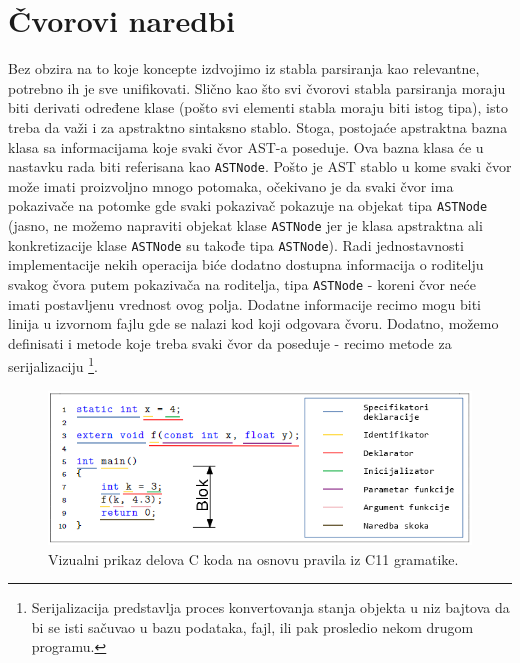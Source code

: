 \section{Čvorovi naredbi}
\label{sec:MyASTStatementNodes}


\iffalse
Bez obzira na to koje koncepte izdvojimo iz stabla parsiranja kao relevantne, potrebno ih je sve unifikovati. Slično kao što svi čvorovi stabla parsiranja moraju biti derivati određene klase (pošto svi elementi stabla moraju biti istog tipa), isto treba da važi i za apstraktno sintaksno stablo. Stoga, postojaće apstraktna bazna klasa sa informacijama koje svaki čvor AST-a poseduje. Ova bazna klasa će u nastavku rada biti referisana kao \texttt{ASTNode}. Pošto je AST stablo u kome svaki čvor može imati proizvoljno mnogo potomaka, očekivano je da svaki čvor ima pokazivače na potomke gde svaki pokazivač pokazuje na objekat tipa \texttt{ASTNode} (jasno, ne možemo napraviti objekat klase \texttt{ASTNode} jer je klasa apstraktna ali konkretizacije klase \texttt{ASTNode} su takođe tipa \texttt{ASTNode}). Radi jednostavnosti implementacije nekih operacija biće dodatno dostupna informacija o roditelju svakog čvora putem pokazivača na roditelja, tipa \texttt{ASTNode} - koreni čvor neće imati postavljenu vrednost ovog polja. Dodatne informacije recimo mogu biti linija u izvornom fajlu gde se nalazi kod koji odgovara čvoru. Dodatno, možemo definisati i metode koje treba svaki čvor da poseduje - recimo metode za serijalizaciju \footnote{Serijalizacija predstavlja proces konvertovanja stanja objekta u niz bajtova da bi se isti sačuvao u bazu podataka, fajl, ili pak prosledio nekom drugom programu.}. 

\begin{figure}[h!]
    \centering
        \includegraphics[scale=0.9]{images/c_code_decomposition.png}
    \caption{Vizualni prikaz delova C koda na osnovu pravila iz C11 gramatike.}
    \label{fig:CDecomposition}
\end{figure}

